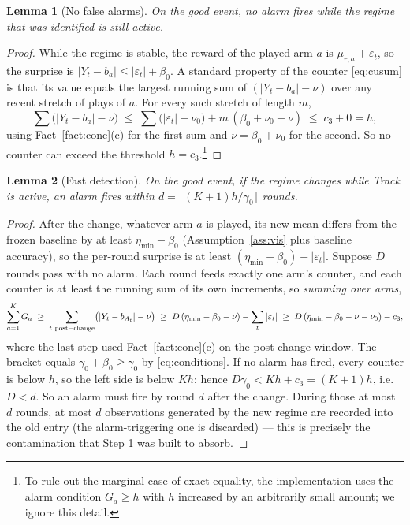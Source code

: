 \documentclass[11pt]{article}
\newtheorem{lemma}{Lemma}
\newcommand{\nun}{\nu_0}
\begin{document}
\begin{lemma}[No false alarms]
\label{lem:fa}
On the good event, no alarm fires while the regime that was identified is still active.
\end{lemma}

\begin{proof}
While the regime is stable, the reward of the played arm $a$ is $\mu_{r,a}+\varepsilon_t$, so the surprise is $|Y_t-b_a|\le|\varepsilon_t|+\beta_0$. A standard property of the counter \eqref{eq:cusum} is that its value equals the largest running sum of $(|Y_t-b_a|-\nu)$ over any recent stretch of plays of $a$. For every such stretch of length $m$,
\[
\sum\bigl(|Y_t-b_a|-\nu\bigr)
\;\le\;\sum\bigl(|\varepsilon_t|-\nun\bigr)+m\,(\beta_0+\nun-\nu)
\;\le\;c_3+0=h ,
\]
using Fact~\ref{fact:conc}(c) for the first sum and $\nu=\beta_0+\nun$ for the second. So no counter can exceed the threshold $h=c_3$.\footnote{To rule out the marginal case of exact equality, the implementation uses the alarm condition $G_a\ge h$ with $h$ increased by an arbitrarily small amount; we ignore this detail.}
\end{proof}

\begin{lemma}[Fast detection]
\label{lem:delay}
On the good event, if the regime changes while Track is active, an alarm fires within $d=\lceil(K{+}1)h/\gamma_0\rceil$ rounds.
\end{lemma}

\begin{proof}
After the change, whatever arm $a$ is played, its new mean differs from the frozen baseline by at least $\eta_{\min}-\beta_0$ (Assumption~\ref{ass:vis} plus baseline accuracy), so the per-round surprise is at least $(\eta_{\min}-\beta_0)-|\varepsilon_t|$. Suppose $D$ rounds pass with no alarm. Each round feeds exactly one arm's counter, and each counter is at least the running sum of its own increments, so \emph{summing over arms},
\[
\sum_{a=1}^K G_a
\;\ge\;\sum_{t\ \rm post-change}\bigl(|Y_t-b_{A_t}|-\nu\bigr)
\;\ge\; D\,(\eta_{\min}-\beta_0-\nu)-\sum_{t}|\varepsilon_t|
\;\ge\; D\,(\eta_{\min}-\beta_0-\nu-\nun)-c_3 ,
\]
where the last step used Fact~\ref{fact:conc}(c) on the post-change window. The bracket equals $\gamma_0+\beta_0\ge\gamma_0$ by \eqref{eq:conditions}. If no alarm has fired, every counter is below $h$, so the left side is below $Kh$; hence $D\gamma_0<Kh+c_3=(K{+}1)h$, i.e.\ $D<d$. So an alarm must fire by round $d$ after the change. During those at most $d$ rounds, at most $d$ observations generated by the new regime are recorded into the old entry (the alarm-triggering one is discarded) --- this is precisely the contamination that Step 1 was built to absorb.
\end{proof}
\end{document}
